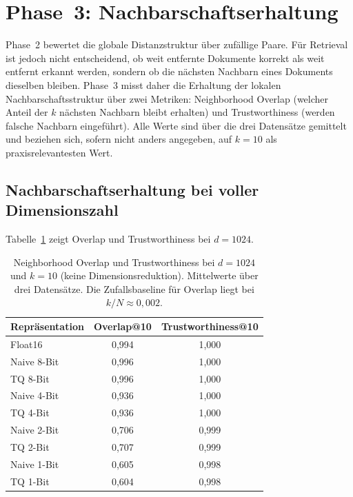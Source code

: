 \section{Phase~3: Nachbarschaftserhaltung}
\label{sec:ergebnisse_phase3}
%
Phase~2 bewertet die globale Distanzstruktur über zufällige Paare.
Für Retrieval ist jedoch nicht entscheidend, ob weit entfernte Dokumente korrekt als weit entfernt erkannt werden, sondern ob die nächsten Nachbarn eines Dokuments dieselben bleiben.
Phase~3 misst daher die Erhaltung der lokalen Nachbarschaftsstruktur über zwei Metriken: Neighborhood Overlap (welcher Anteil der $k$ nächsten Nachbarn bleibt erhalten) und Trustworthiness (werden falsche Nachbarn eingeführt).
Alle Werte sind über die drei Datensätze gemittelt und beziehen sich, sofern nicht anders angegeben, auf $k = 10$ als praxisrelevantesten Wert.
%
\subsection{Nachbarschaftserhaltung bei voller Dimensionszahl}
\label{sec:ergebnisse_phase3_fulldim}
%
Tabelle~\ref{tab:phase3_fulldim} zeigt Overlap und Trustworthiness bei $d = 1024$.
%
\begin{table}[htbp]
  \centering
  \caption[Neighborhood Overlap und Trustworthiness bei voller Dimensionszahl]{Neighborhood Overlap und Trustworthiness bei $d = 1024$ und $k = 10$ (keine Dimensionsreduktion). Mittelwerte über drei Datensätze. Die Zufallsbaseline für Overlap liegt bei $k/N \approx 0{,}002$.}
  \label{tab:phase3_fulldim}
  \begin{tabular}{lcc}
    \toprule
    Repräsentation & Overlap@10 & Trustworthiness@10 \\
    \midrule
    Float16         & 0{,}994 & 1{,}000 \\
    Naive 8-Bit     & 0{,}996 & 1{,}000 \\
    TQ 8-Bit        & 0{,}996 & 1{,}000 \\
    Naive 4-Bit     & 0{,}936 & 1{,}000 \\
    TQ 4-Bit        & 0{,}936 & 1{,}000 \\
    Naive 2-Bit     & 0{,}706 & 0{,}999 \\
    TQ 2-Bit        & 0{,}707 & 0{,}999 \\
    Naive 1-Bit     & 0{,}605 & 0{,}998 \\
    TQ 1-Bit        & 0{,}604 & 0{,}998 \\
    \bottomrule
  \end{tabular}
\end{table}
%
